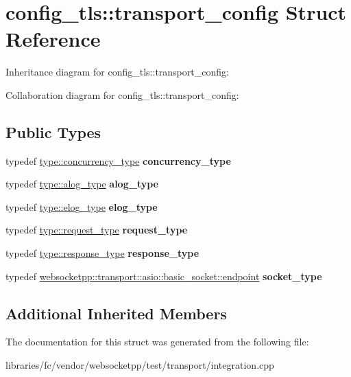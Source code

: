 \hypertarget{structconfig__tls_1_1transport__config}{}\section{config\+\_\+tls\+:\+:transport\+\_\+config Struct Reference}
\label{structconfig__tls_1_1transport__config}


Inheritance diagram for config\+\_\+tls\+:\+:transport\+\_\+config\+:


Collaboration diagram for config\+\_\+tls\+:\+:transport\+\_\+config\+:
\subsection*{Public Types}
\begin{DoxyCompactItemize}
\item 
\mbox{\label{structconfig__tls_1_1transport__config_a1f0cd9699b3181a9f573cd0b0f8393fb}} 
typedef \mbox{\hyperlink{classwebsocketpp_1_1concurrency_1_1none}{type\+::concurrency\+\_\+type}} {\bfseries concurrency\+\_\+type}
\item 
\mbox{\label{structconfig__tls_1_1transport__config_a6da917b1b7b5a5a95ef8a9ca970f320d}} 
typedef \mbox{\hyperlink{classwebsocketpp_1_1log_1_1stub}{type\+::alog\+\_\+type}} {\bfseries alog\+\_\+type}
\item 
\mbox{\label{structconfig__tls_1_1transport__config_a6f2e41ad27320a4669b62ad6030db57c}} 
typedef \mbox{\hyperlink{classwebsocketpp_1_1log_1_1stub}{type\+::elog\+\_\+type}} {\bfseries elog\+\_\+type}
\item 
\mbox{\label{structconfig__tls_1_1transport__config_ac7a24557c541c2119c2679af9eb0d2f3}} 
typedef \mbox{\hyperlink{classwebsocketpp_1_1http_1_1parser_1_1request}{type\+::request\+\_\+type}} {\bfseries request\+\_\+type}
\item 
\mbox{\label{structconfig__tls_1_1transport__config_a617d954d9d6246baf855df2cd026380d}} 
typedef \mbox{\hyperlink{classwebsocketpp_1_1http_1_1parser_1_1response}{type\+::response\+\_\+type}} {\bfseries response\+\_\+type}
\item 
\mbox{\label{structconfig__tls_1_1transport__config_adc924874bc16f2275cd477841cf167c7}} 
typedef \mbox{\hyperlink{classwebsocketpp_1_1transport_1_1asio_1_1basic__socket_1_1endpoint}{websocketpp\+::transport\+::asio\+::basic\+\_\+socket\+::endpoint}} {\bfseries socket\+\_\+type}
\end{DoxyCompactItemize}
\subsection*{Additional Inherited Members}


The documentation for this struct was generated from the following file\+:\begin{DoxyCompactItemize}
\item 
libraries/fc/vendor/websocketpp/test/transport/integration.\+cpp\end{DoxyCompactItemize}
